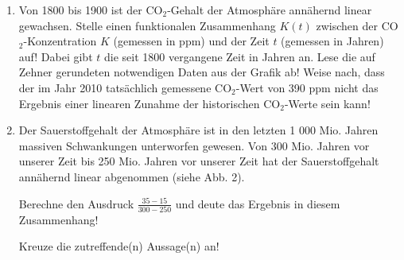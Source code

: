 \begin{langesbeispiel}
\begin{enumerate}
	
		\item Von 1800 bis 1900 ist der CO$_2$-Gehalt der Atmosphäre annähernd linear gewachsen. Stelle einen funktionalen Zusammenhang $K(t)$ zwischen der CO$_2$-Konzentration $K$ (gemessen in ppm) und der Zeit $t$ (gemessen in Jahren) auf! Dabei gibt $t$ die seit 1800 vergangene Zeit in Jahren an. Lese die auf Zehner gerundeten notwendigen Daten aus der Grafik ab!  Weise nach, dass der im Jahr 2010 tatsächlich gemessene CO$_2$-Wert von 390 ppm nicht das Ergebnis einer linearen Zunahme der historischen CO$_2$-Werte sein kann!

	
		\item Der Sauerstoffgehalt der Atmosphäre ist in den letzten 1 000 Mio. Jahren massiven Schwankungen unterworfen gewesen. Von 300 Mio. Jahren vor unserer Zeit bis 250 Mio. Jahren vor unserer Zeit hat der Sauerstoffgehalt annähernd linear abgenommen (siehe Abb. 2).
		
		 Berechne den Ausdruck $\frac{35-15}{300-250}$ und deute das Ergebnis in diesem Zusammenhang!
		
		Kreuze die zutreffende(n) Aussage(n) an!
		

\end{enumerate}
\end{langesbeispiel}
